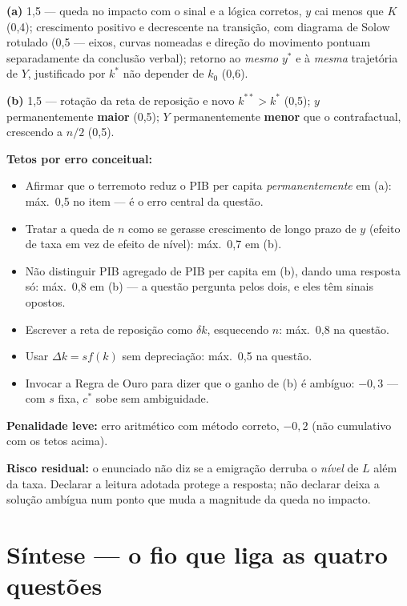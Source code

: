 \documentclass[11pt, a4paper]{article}
\newcommand{\stst}{^{\ast}}
\newcommand{\ststst}{^{\ast\ast}}
\begin{document}
\begin{tcolorbox}[rubricbox]
\small
\textbf{(a)} 1,5 --- queda no impacto com o sinal e a lógica corretos, $y$ cai menos que
$K$ (0,4); crescimento positivo e decrescente na transição, com diagrama de Solow
rotulado (0,5 --- eixos, curvas nomeadas e direção do movimento pontuam separadamente da
conclusão verbal); retorno ao \emph{mesmo} $y\stst$ e à \emph{mesma} trajetória de $Y$,
justificado por $k\stst$ não depender de $k_0$ (0,6).

\smallskip
\textbf{(b)} 1,5 --- rotação da reta de reposição e novo $k\ststst > k\stst$ (0,5);
$y$ permanentemente \textbf{maior} (0,5); $Y$ permanentemente \textbf{menor} que o
contrafactual, crescendo a $n/2$ (0,5).

\smallskip
\textbf{Tetos por erro conceitual:}
\begin{itemize}[topsep=2pt]
\item Afirmar que o terremoto reduz o PIB per capita \emph{permanentemente} em (a):
      máx.\ 0,5 no item --- é o erro central da questão.
\item Tratar a queda de $n$ como se gerasse crescimento de longo prazo de $y$ (efeito de
      taxa em vez de efeito de nível): máx.\ 0,7 em (b).
\item Não distinguir PIB agregado de PIB per capita em (b), dando uma resposta só:
      máx.\ 0,8 em (b) --- a questão pergunta pelos dois, e eles têm sinais opostos.
\item Escrever a reta de reposição como $\delta k$, esquecendo $n$: máx.\ 0,8 na questão.
\item Usar $\Delta k = s f(k)$ sem depreciação: máx.\ 0,5 na questão.
\item Invocar a Regra de Ouro para dizer que o ganho de (b) é ambíguo: $-0{,}3$ ---
      com $s$ fixa, $c\stst$ sobe sem ambiguidade.
\end{itemize}
\textbf{Penalidade leve:} erro aritmético com método correto, $-0{,}2$ (não cumulativo com
os tetos acima).

\smallskip
\textbf{Risco residual:} o enunciado não diz se a emigração derruba o \emph{nível} de $L$
além da taxa. Declarar a leitura adotada protege a resposta; não declarar deixa a solução
ambígua num ponto que muda a magnitude da queda no impacto.
\end{tcolorbox}

\section*{Síntese --- o fio que liga as quatro questões}
\end{document}
